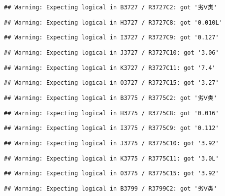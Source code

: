 \documentclass[
]{article}
\begin{document}
\begin{verbatim}
## Warning: Expecting logical in B3727 / R3727C2: got '劣Ⅴ类'
\end{verbatim}

\begin{verbatim}
## Warning: Expecting logical in H3727 / R3727C8: got '0.010L'
\end{verbatim}

\begin{verbatim}
## Warning: Expecting logical in I3727 / R3727C9: got '0.127'
\end{verbatim}

\begin{verbatim}
## Warning: Expecting logical in J3727 / R3727C10: got '3.06'
\end{verbatim}

\begin{verbatim}
## Warning: Expecting logical in K3727 / R3727C11: got '7.4'
\end{verbatim}

\begin{verbatim}
## Warning: Expecting logical in O3727 / R3727C15: got '3.27'
\end{verbatim}

\begin{verbatim}
## Warning: Expecting logical in B3775 / R3775C2: got '劣Ⅴ类'
\end{verbatim}

\begin{verbatim}
## Warning: Expecting logical in H3775 / R3775C8: got '0.016'
\end{verbatim}

\begin{verbatim}
## Warning: Expecting logical in I3775 / R3775C9: got '0.112'
\end{verbatim}

\begin{verbatim}
## Warning: Expecting logical in J3775 / R3775C10: got '3.92'
\end{verbatim}

\begin{verbatim}
## Warning: Expecting logical in K3775 / R3775C11: got '3.0L'
\end{verbatim}

\begin{verbatim}
## Warning: Expecting logical in O3775 / R3775C15: got '3.92'
\end{verbatim}

\begin{verbatim}
## Warning: Expecting logical in B3799 / R3799C2: got '劣Ⅴ类'
\end{verbatim}
\end{document}
